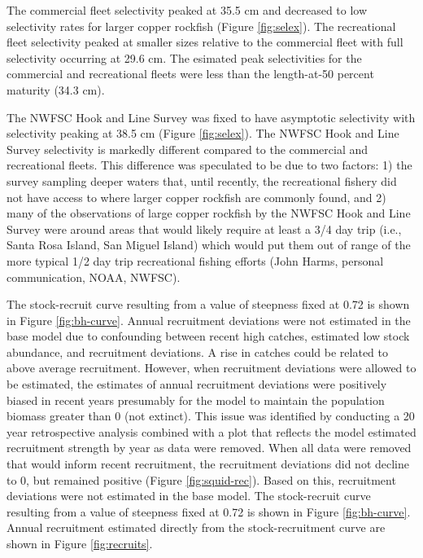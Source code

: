 \documentclass[11pt,
  english,
  a4paper,
]{article}
\begin{document}
\leavevmode\tagmcend\tagstructend\par


The commercial fleet selectivity peaked at 35.5 cm and decreased to low selectivity rates for larger copper rockfish (Figure \ref{fig:selex}). The recreational fleet selectivity peaked at smaller sizes relative to the commercial fleet with full selectivity occurring at 29.6 cm. The esimated peak selectivities for the commercial and recreational fleets were less than the length-at-50 percent maturity (34.3 cm).

\leavevmode\tagmcend\tagstructend\par


The NWFSC Hook and Line Survey was fixed to have asymptotic selectivity with selectivity peaking at 38.5 cm (Figure \ref{fig:selex}). The NWFSC Hook and Line Survey selectivity is markedly different compared to the commercial and recreational fleets. This difference was speculated to be due to two factors: 1) the survey sampling deeper waters that, until recently, the recreational fishery did not have access to where larger copper rockfish are commonly found, and 2) many of the observations of large copper rockfish by the NWFSC Hook and Line Survey were around areas that would likely require at least a 3/4 day trip (i.e., Santa Rosa Island, San Miguel Island) which would put them out of range of the more typical 1/2 day trip recreational fishing efforts (John Harms, personal communication, NOAA, NWFSC).

\leavevmode\tagmcend\tagstructend\par


The stock-recruit curve resulting from a value of steepness fixed at 0.72 is shown in Figure \ref{fig:bh-curve}. Annual recruitment deviations were not estimated in the base model due to confounding between recent high catches, estimated low stock abundance, and recruitment deviations. A rise in catches could be related to above average recruitment. However, when recruitment deviations were allowed to be estimated, the estimates of annual recruitment deviations were positively biased in recent years presumably for the model to maintain the population biomass greater than 0 (not extinct). This issue was identified by conducting a 20 year retrospective analysis combined with a plot that reflects the model estimated recruitment strength by year as data were removed. When all data were removed that would inform recent recruitment, the recruitment deviations did not decline to 0, but remained positive (Figure \ref{fig:squid-rec}). Based on this, recruitment deviations were not estimated in the base model. The stock-recruit curve resulting from a value of steepness fixed at 0.72 is shown in Figure \ref{fig:bh-curve}. Annual recruitment estimated directly from the stock-recruitment curve are shown in Figure \ref{fig:recruits}.
\end{document}
